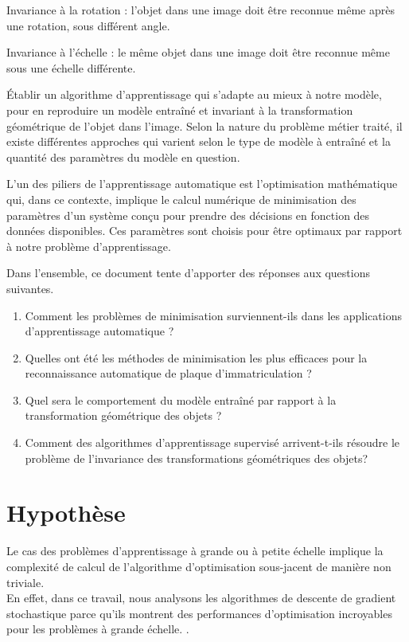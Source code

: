 		\begin{list}{--}{Les modèles entraînés doivent être invariants sous des transformations géométriques et qualités des objets observés.}
			\item Invariance à la rotation : l'objet dans une image doit être reconnue même après une rotation, sous  différent angle.
			\item Invariance à l'échelle : le même objet dans une image doit être reconnue même sous une échelle différente.
		\end{list}
		
		Établir un algorithme d’apprentissage qui s'adapte au mieux à notre modèle, pour en reproduire un modèle entraîné et invariant à la transformation géométrique de l’objet dans l'image. Selon la nature du problème métier traité, il existe différentes approches qui varient selon le type de modèle à entraîné et la quantité des paramètres du modèle en question.
		
		L'un des piliers de l'apprentissage automatique est l'optimisation mathématique \cite{bottou2018optimization} qui, dans ce contexte, implique le calcul numérique de minimisation des paramètres d'un système conçu pour prendre des décisions en fonction des données disponibles. Ces paramètres sont choisis pour être optimaux par rapport à notre problème d'apprentissage.
		
		Dans l'ensemble, ce document tente d'apporter des réponses aux questions suivantes.
		\begin{enumerate}
			\item Comment les problèmes de minimisation surviennent-ils dans les applications d'apprentissage automatique ?
			\item Quelles ont été les méthodes de minimisation les plus efficaces pour la reconnaissance automatique de plaque d’immatriculation ?
			\item Quel sera le comportement du  modèle entraîné par rapport à la transformation géométrique des objets ?
			
			\item Comment des algorithmes d'apprentissage supervisé arrivent-t-ils résoudre le problème de l’invariance des transformations géométriques des objets?
		\end{enumerate}
	
	\section{Hypothèse}
		Le cas des problèmes d'apprentissage à grande ou à petite échelle implique la complexité de calcul de l'algorithme d'optimisation sous-jacent de manière non triviale.\\
		En effet, dans ce travail, nous analysons les algorithmes de descente de gradient stochastique parce qu’ils montrent des performances  d'optimisation incroyables pour les problèmes à grande échelle. \cite{bottou2010large}.
		
